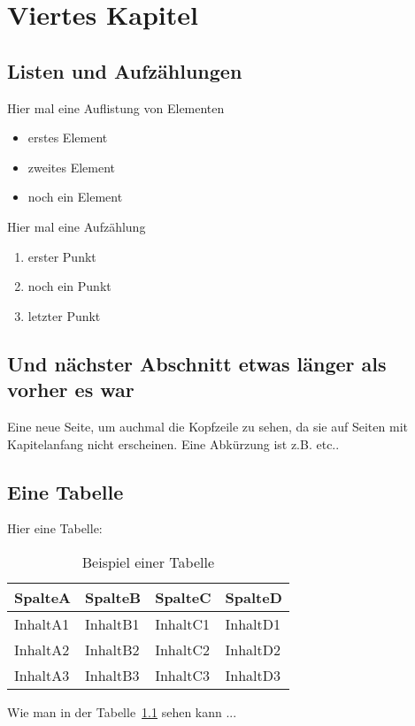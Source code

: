 \chapter{Viertes Kapitel}
\section{Listen und Aufz\"ahlungen}

Hier mal eine Auflistung von Elementen
\begin{itemize}
 \item erstes Element
 \item zweites Element
 \item noch ein Element
\end{itemize}

Hier mal eine Aufz\"ahlung
\begin{enumerate}
 \item erster Punkt
 \item noch ein Punkt
 \item letzter Punkt
\end{enumerate}

\newpage

\section{Und n\"achster Abschnitt etwas l\"anger als vorher es war}
Eine neue Seite, um auchmal die Kopfzeile zu sehen, da sie auf Seiten mit Kapitelanfang nicht erscheinen. Eine Abk\"urzung ist z.B. etc..

\newpage
\section{Eine Tabelle}

Hier eine Tabelle:
\begin{table}[htbp]
\centering
\begin{tabular}{l|l|l|l}
SpalteA & SpalteB & SpalteC & SpalteD \\
\midrule
InhaltA1 & InhaltB1 & InhaltC1 & InhaltD1 \\
InhaltA2 & InhaltB2 & InhaltC2 & InhaltD2 \\
InhaltA3 & InhaltB3 & InhaltC3 & InhaltD3
\end{tabular}
\caption{Beispiel einer Tabelle}
\label{tab:tabelle1}
\end{table}

Wie man in der Tabelle~\ref{tab:tabelle1} sehen kann ...
